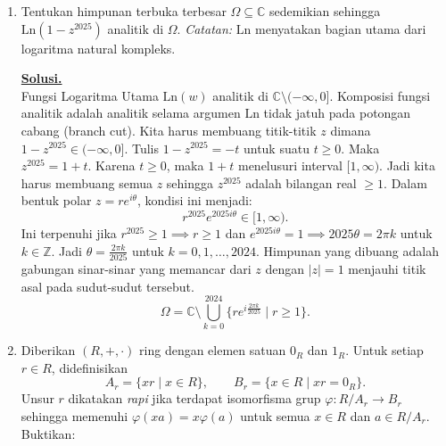 \documentclass[12pt,twoside]{article}
\newenvironment{solution}
{
	\par\noindent\textbf{\underline{Solusi.}}\\
}
{
	\par
}
\begin{document}
\begin{enumerate}
  \item Tentukan himpunan terbuka terbesar $\Omega \subseteq \mathbb{C}$ sedemikian sehingga $\mathrm{Ln}(1 - z^{2025})$ analitik di $\Omega$.
        \emph{Catatan:} $\mathrm{Ln}$ menyatakan bagian utama dari logaritma natural kompleks.
        \begin{solution}
          Fungsi Logaritma Utama $\mathrm{Ln}(w)$ analitik di $\mathbb{C} \setminus (-\infty, 0]$.
          Komposisi fungsi analitik adalah analitik selama argumen $\mathrm{Ln}$ tidak jatuh pada potongan cabang (branch cut).
          Kita harus membuang titik-titik $z$ dimana $1 - z^{2025} \in (-\infty, 0]$.
            Tulis $1 - z^{2025} = -t$ untuk suatu $t \ge 0$.
            Maka $z^{2025} = 1 + t$.
            Karena $t \ge 0$, maka $1+t$ menelusuri interval $[1, \infty)$.
          Jadi kita harus membuang semua $z$ sehingga $z^{2025}$ adalah bilangan real $\ge 1$.
          Dalam bentuk polar $z = r e^{i\theta}$, kondisi ini menjadi:
          \[ r^{2025} e^{2025 i \theta} \in [1, \infty). \]
          Ini terpenuhi jika $r^{2025} \ge 1 \implies r \ge 1$ dan $e^{2025 i \theta} = 1 \implies 2025 \theta = 2\pi k$ untuk $k \in \mathbb{Z}$.
          Jadi $\theta = \frac{2\pi k}{2025}$ untuk $k = 0, 1, \dots, 2024$.
          Himpunan yang dibuang adalah gabungan sinar-sinar yang memancar dari $z$ dengan $|z|=1$ menjauhi titik asal pada sudut-sudut tersebut.
          \[ \Omega = \mathbb{C} \setminus \bigcup_{k=0}^{2024} \{ r e^{i \frac{2\pi k}{2025}} \mid r \ge 1 \}. \]
        \end{solution}

  \item Diberikan $(R, +, \cdot)$ ring dengan elemen satuan $0_R$ dan $1_R$. Untuk setiap $r \in R$, didefinisikan
        \[
          A_r = \{xr \mid x \in R\}, \qquad B_r = \{x \in R \mid xr = 0_R\}.
        \]
        Unsur $r$ dikatakan \emph{rapi} jika terdapat isomorfisma grup $\varphi : R/A_r \to B_r$ sehingga memenuhi
        $\varphi(xa) = x\varphi(a)$ untuk semua $x \in R$ dan $a \in R/A_r$. Buktikan:


\end{enumerate}
\end{document}
